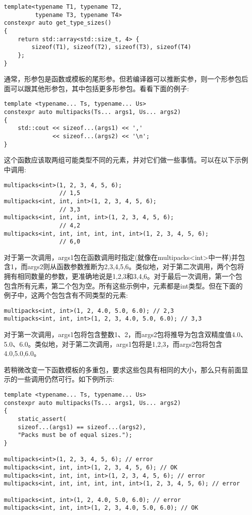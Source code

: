 \begin{lstlisting}[style=styleCXX]
template<typename T1, typename T2,
         typename T3, typename T4>
constexpr auto get_type_sizes()
{
	return std::array<std::size_t, 4> {
		sizeof(T1), sizeof(T2), sizeof(T3), sizeof(T4)
	};
}
\end{lstlisting}

通常，形参包是函数或模板的尾形参。但若编译器可以推断实参，则一个形参包后面可以跟其他形参包，其中包括更多形参包。看看下面的例子:

\begin{lstlisting}[style=styleCXX]
template <typename... Ts, typename... Us>
constexpr auto multipacks(Ts... args1, Us... args2)
{
	std::cout << sizeof...(args1) << ','
	          << sizeof...(args2) << '\n';
}
\end{lstlisting}

这个函数应该取两组可能类型不同的元素，并对它们做一些事情。可以在以下示例中调用:

\begin{lstlisting}[style=styleCXX]
multipacks<int>(1, 2, 3, 4, 5, 6);
                // 1,5
multipacks<int, int, int>(1, 2, 3, 4, 5, 6);
                // 3,3
multipacks<int, int, int, int>(1, 2, 3, 4, 5, 6);
                // 4,2
multipacks<int, int, int, int, int, int>(1, 2, 3, 4, 5, 6);
                // 6,0
\end{lstlisting}

对于第一次调用，args1包在函数调用时指定(就像在multipacks<int>中一样)并包含1，而args2则从函数参数推断为2,3,4,5,6。类似地，对于第二次调用，两个包将拥有相同数量的参数，更准确地说是1,2,3和3,4,6。对于最后一次调用，第一个包包含所有元素，第二个包为空。所有这些示例中，元素都是int类型。但在下面的例子中，这两个包包含有不同类型的元素:

\begin{lstlisting}[style=styleCXX]
multipacks<int, int>(1, 2, 4.0, 5.0, 6.0); // 2,3
multipacks<int, int, int>(1, 2, 3, 4.0, 5.0, 6.0); // 3,3
\end{lstlisting}

对于第一次调用，args1包将包含整数1、2，而args2包将推导为包含双精度值4.0、5.0、6.0。类似地，对于第二次调用，args1包将是1,2,3，而args2包将包含4.0,5.0,6.0。

若稍微改变一下函数模板的多重包，要求这些包具有相同的大小，那么只有前面显示的一些调用仍然可行。如下例所示:

\begin{lstlisting}[style=styleCXX]
template <typename... Ts, typename... Us>
constexpr auto multipacks(Ts... args1, Us... args2)
{
	static_assert(
	sizeof...(args1) == sizeof...(args2),
	"Packs must be of equal sizes.");
}

multipacks<int>(1, 2, 3, 4, 5, 6); // error
multipacks<int, int, int>(1, 2, 3, 4, 5, 6); // OK
multipacks<int, int, int, int>(1, 2, 3, 4, 5, 6); // error
multipacks<int, int, int, int, int, int>(1, 2, 3, 4, 5, 6); // error

multipacks<int, int>(1, 2, 4.0, 5.0, 6.0); // error
multipacks<int, int, int>(1, 2, 3, 4.0, 5.0, 6.0); // OK
\end{lstlisting}

